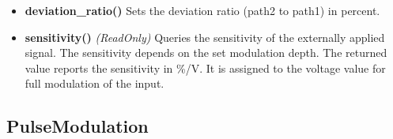 \documentclass[11pt]{article} %
\begin{document}
\begin{itemize}
\begin{itemize}[]
	\end{itemize}
	{\it This parameter was not working on the test device but there is no hint to an option to install in the manual. So this parameter will be hidden in the current version.}
\item {\bf deviation\_ratio()} Sets the deviation ratio (path2 to path1) in percent.
\item {\bf sensitivity()} {\it (ReadOnly)} Queries the sensitivity of the externally applied signal. The sensitivity depends on the set modulation depth. The returned value reports the sensitivity in \%/V. It is assigned to the voltage value for full modulation of the input.
\end{itemize}


\subsection{PulseModulation}
\end{document}
